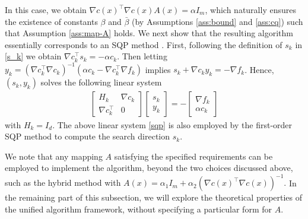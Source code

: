 \documentclass[11pt]{article}
\def\red#1{\textcolor{red}{#1}}
\newcommand{\be}{\begin{equation}}
\newcommand{\ee}{\end{equation}}
\begin{document}
\begin{itemize}
    In this case, we obtain $\nabla c(x)^\top \nabla c(x) A(x) = \alpha I_m$, which naturally ensures the existence of constants $\beta$ and $\bar\beta $ (by Assumptions \ref{ass:bound} and \ref{ass:cq}) such that Assumption \ref{ass:map-A} holds. We next show that the resulting algorithm  essentially corresponds to an SQP method \cite{curtis2024worst,curtis2024sequential}. First, following the definition of $s_k$ in \eqref{s_k} we obtain 
    $\nabla c_k^\top s_k = -\alpha c_k$. Then letting \(y_k = (\nabla c_k^\top \nabla c_k)^{-1} (\alpha c_k - \nabla c_k^\top \nabla f_k)\) implies \(s_k + \nabla c_k y_k = - \nabla f_k\). Hence, \((s_k,y_k)\) solves the following linear system
    \be\begin{aligned}\label{sqp}
    \begin{bmatrix}
    H_k & \nabla c_k \\
    \nabla c_k^\top & 0
    \end{bmatrix}
    \begin{bmatrix}
    s_k \\
    y_k
    \end{bmatrix}
    =
    -
    \begin{bmatrix}
    \nabla f_k \\
    \alpha c_k
    \end{bmatrix}
    \end{aligned}\ee
    with \(H_k = I_d\). The above linear system \eqref{sqp} is also employed by the first-order SQP method \cite{curtis2024worst} to compute the search direction $s_k$.
\end{itemize}

We note that any mapping $A$ satisfying the specified requirements can be employed to implement the algorithm, beyond the two choices discussed above, {such as the hybrid method with \(A(x) = \alpha_1 I_m + \alpha_2 (\nabla c(x)^{\top} \nabla c(x))^{-1}\).} In the remaining part of this subsection, we will explore the theoretical properties of the unified algorithm framework, without specifying a particular form for  $A.$ 

\end{document}
